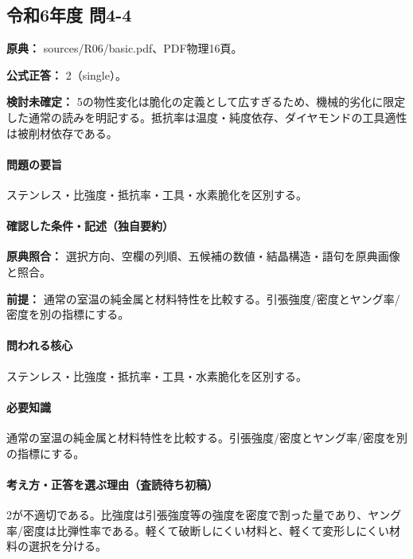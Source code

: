 \subsection{令和6年度 問4-4}
\label{q:r06-reg-basic-4-4}

\noindent\textbf{原典：} sources/R06/basic.pdf、PDF物理16頁。

\textbf{公式正答：} 2（single）。

\par\textbf{検討未確定：} 5の物性変化は脆化の定義として広すぎるため、機械的劣化に限定した通常の読みを明記する。抵抗率は温度・純度依存、ダイヤモンドの工具適性は被削材依存である。

\paragraph{問題の要旨} ステンレス・比強度・抵抗率・工具・水素脆化を区別する。

\paragraph{確認した条件・記述（独自要約）}\mbox{}\par

\noindent\textbf{原典照合：} 選択方向、空欄の列順、五候補の数値・結晶構造・語句を原典画像と照合。\par

\noindent\textbf{前提：} 通常の室温の純金属と材料特性を比較する。引張強度/密度とヤング率/密度を別の指標にする。\par

\paragraph{問われる核心} ステンレス・比強度・抵抗率・工具・水素脆化を区別する。

\paragraph{必要知識} 通常の室温の純金属と材料特性を比較する。引張強度/密度とヤング率/密度を別の指標にする。

\paragraph{考え方・正答を選ぶ理由（査読待ち初稿）} 2が不適切である。比強度は引張強度等の強度を密度で割った量であり、ヤング率/密度は比弾性率である。軽くて破断しにくい材料と、軽くて変形しにくい材料の選択を分ける。

